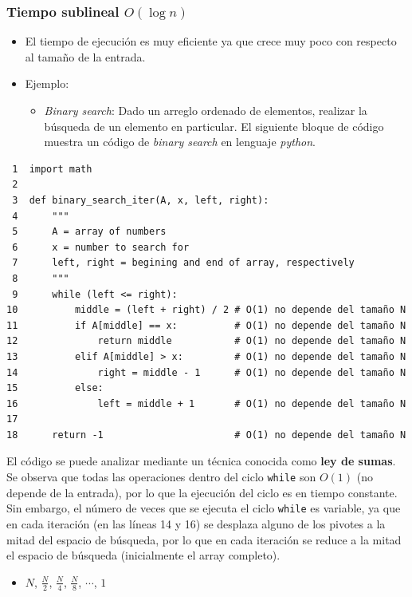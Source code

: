 \documentclass[letterpaper]{article}
\begin{document}
\subsubsection{Tiempo sublineal \(O(\log n)\)}
\label{sec:orgd070ba1}
\begin{itemize}
\item El tiempo de ejecución es muy eficiente ya que crece muy poco con respecto al
tamaño de la entrada.
\item Ejemplo:
\begin{itemize}
\item \emph{Binary search}: Dado un arreglo ordenado de elementos, realizar la búsqueda
de un elemento en particular. El siguiente bloque de código muestra un
código de \emph{binary search} en lenguaje \emph{python}.
\end{itemize}
\end{itemize}
\begin{verbatim}
 1  import math
 2  
 3  def binary_search_iter(A, x, left, right):
 4      """
 5      A = array of numbers
 6      x = number to search for
 7      left, right = begining and end of array, respectively
 8      """
 9      while (left <= right):
10          middle = (left + right) / 2 # O(1) no depende del tamaño N
11          if A[middle] == x:          # O(1) no depende del tamaño N
12              return middle           # O(1) no depende del tamaño N
13          elif A[middle] > x:         # O(1) no depende del tamaño N
14              right = middle - 1      # O(1) no depende del tamaño N
15          else:
16              left = middle + 1       # O(1) no depende del tamaño N
17  
18      return -1                       # O(1) no depende del tamaño N
\end{verbatim}

El código se puede analizar mediante un técnica conocida como \textbf{ley de sumas}. Se
observa que todas las operaciones dentro del ciclo \texttt{while} son \(O(1)\) (no
depende de la entrada), por lo que la ejecución del ciclo es en tiempo
constante. Sin embargo, el número de veces que se ejecuta el ciclo \texttt{while} es
variable, ya que en cada iteración (en las líneas 14 y 16) se desplaza alguno de
los pivotes a la mitad del espacio de búsqueda, por lo que en cada iteración
se reduce a la mitad el espacio de búsqueda (inicialmente el array completo).
\begin{itemize}
\item \(N\), \(\frac{N}{2}\), \(\frac{N}{4}\), \(\frac{N}{8}\), \(\cdots\), \(1\)
\end{itemize}
\end{document}
